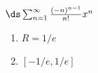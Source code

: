 {$\ds\sum_{n=1}^\infty \frac{(-n)^{n-1}}{n!} x^n$
}
{\begin{enumerate}
	\item $R=1/e$
	\item	$[-1/e,1/e]$
\end{enumerate}
}